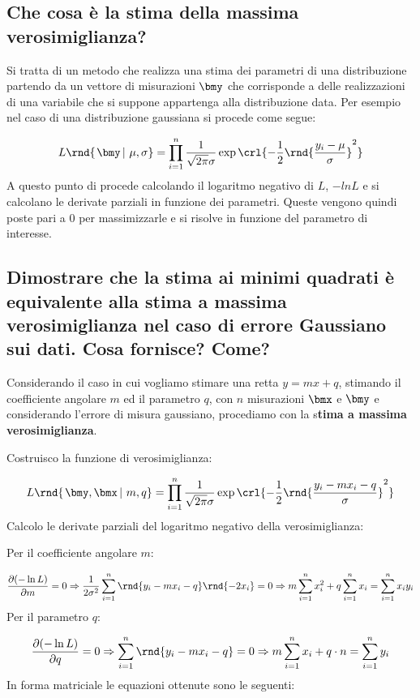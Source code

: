 \documentclass[\main/main.tex]{subfiles}
\begin{document}
\subsection{Che cosa è la stima della massima verosimiglianza?}
Si tratta di un metodo che realizza una stima dei parametri di una distribuzione partendo da un vettore di misurazioni $\bmy$ che corrisponde a delle realizzazioni di una variabile che si suppone appartenga alla distribuzione data. Per esempio nel caso di una distribuzione gaussiana si procede come segue:

\[
  L\rnd{\left. \bmy\,\right\rvert\, \mu, \sigma} = \prod_{i=1}^n \frac{1}{\sqrt{2\pi}\sigma} \exp\crl{-\frac{1}{2}\rnd{\frac{y_i-\mu}{\sigma}}^2}
\]
A questo punto di procede calcolando il logaritmo negativo di $L$, $-ln{L}$ e si calcolano le derivate parziali in funzione dei parametri. Queste vengono quindi poste pari a 0 per massimizzarle e si risolve in funzione del parametro di interesse.

\subsection{Dimostrare che la stima ai minimi quadrati è equivalente alla stima a massima verosimiglianza nel caso di errore Gaussiano sui dati. Cosa fornisce? Come?}
Considerando il caso in cui vogliamo stimare una retta $y = mx+q$, stimando il coefficiente angolare $m$ ed il parametro $q$, con $n$ misurazioni $\bmx$ e $\bmy$ e considerando l'errore di misura gaussiano, procediamo con la s\textbf{tima a massima verosimiglianza}.

Costruisco la funzione di verosimiglianza:

\[
  L\rnd{\left. \bmy, \bmx \, \right\rvert\, m, q} = \prod_{i=1}^n \frac{1}{\sqrt{2\pi}\sigma} \exp\crl{-\frac{1}{2}\rnd{\frac{y_i-mx_i - q}{\sigma}}^2}
\]
Calcolo le derivate parziali del logaritmo negativo della verosimiglianza:

Per il coefficiente angolare $m$:

\[
  \frac{\partial (-\ln{L})}{\partial m} = 0 \Rightarrow \frac{1}{2\sigma^2} \sum^n_{i=1} \rnd{y_i - mx_i - q}\rnd{-2x_i} = 0 \Rightarrow  m\sum^n_{i=1} x^2_i + q\sum^n_{i=1}x_i = \sum^n_{i=1}x_iy_i
\]
Per il parametro $q$:

\[
  \frac{\partial (-\ln{L})}{\partial q} = 0 \Rightarrow \sum^n_{i=1}\rnd{y_i - mx_i -q} = 0 \Rightarrow  m\sum^n_{i=1}x_i + q\cdot n = \sum^n_{i=1}y_i
\]
In forma matriciale le equazioni ottenute sono le seguenti:
\end{document}
